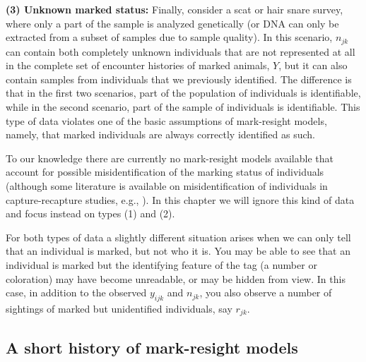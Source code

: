 {\flushleft \bf (3) Unknown marked status:}
Finally, consider a scat or hair snare survey, where only a part of
the sample is analyzed genetically (or DNA can only be extracted
from a subset of samples due to sample quality). In this scenario,
$n_{jk}$ can contain both completely unknown individuals that are
not represented at all in the complete set of encounter histories of marked animals,
{\bf $Y$},
but it can also contain samples
from individuals that we previously identified. The difference is that
in the first two scenarios, part of the population of individuals is
identifiable, while in the second scenario,
 part of the
sample of individuals is identifiable. This type of data
violates one of the basic assumptions of mark-resight models,
namely, that marked individuals are always correctly identified as
such.

To our knowledge there are currently no mark-resight models available
that account for possible misidentification of the marking status of
individuals (although some literature is available on
misidentification of individuals in capture-recapture studies, e.g.,
\citealp{yoshizaki_etal:2009, lukacs_burnham:2005,
  link_etal:2010}). In this chapter we will ignore this kind of data
and focus instead on %
types (1) and (2).


For both types of data a slightly different situation arises when 
we can only tell that an individual is marked, but not
who it is. You may be able to see that an individual is marked but the
identifying feature of the tag (a number or coloration) may have
become unreadable, or may be hidden from view. In this case, in
addition to the observed $y_{ijk}$ and $n_{jk}$, you also observe a number of
sightings of marked but unidentified individuals, say $r_{jk}$.

\subsection{A short history of mark-resight models}

